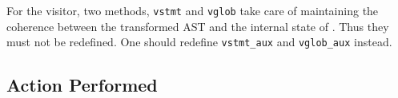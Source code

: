 \begin{important}
  For the \framac visitor, two methods,
  \verb+vstmt+
  and \verb+vglob+ take
  care of maintaining the coherence between the transformed
  AST and the internal state of \framac%
  . Thus they must not be redefined. One should redefine
  \verb+vstmt_aux+ and
  \verb+vglob_aux+ instead.
\end{important}

\subsection{Action Performed}\label{adv:sec:action-performed}

